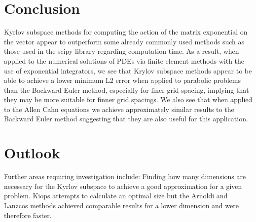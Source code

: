 \documentclass{article}
\begin{document}
\section{Conclusion}
Kyrlov subspace methods for computing the action of the matrix exponential on the vector appear to outperform some already commonly used methods such as those used in the scipy library regarding computation time. As a result, when applied to the numerical solutions of PDEs via finite element methods with the use of exponential integrators, we see that Krylov subspace methods appear to be able to achieve a lower minimum L2 error when applied to parabolic problems than the Backward Euler method, especially for finer grid spacing, implying that they may be more suitable for finner grid spacings.
We also see that when applied to the Allen Cahn equations we achieve approximately similar results to the Backward Euler method suggesting that they are also useful for this application.

\section{Outlook}
Further areas requiring investigation include:
Finding how many dimensions are necessary for the Kyrlov subspace to achieve a good approximation for a given problem. Kiops attempts to calculate an optimal size but the Arnoldi and Lanzcos methods achieved comparable results for a lower dimension and were therefore faster.


\clearpage
\newpage


\end{document}
